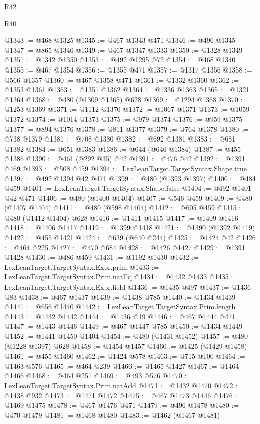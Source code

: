 \begin{lexlean}{R42}
\begin{lexlean}{R40}
\begin{coremodule}
{{{{{{{{{{{{{{{{{{{{{{{{{{{{{{{{{{{{{{{{{{{{{{{{{{{{{{{{{{{{{{{{{{{{{{{{{{{{{{{{{{{{{{{{{{{{{{{{{{{{{{{{{{{{{@1343 := @468 @1325
@1345 := @467 @1343 @471
@1346 := @496 @1345
@1347 := @865 @1346
@1349 := @467 @1347 @1333
@1350 := @1328 @1349
@1351 := @1342 @1350
@1353 := @492 @1295 @72
@1354 := @468 @1340
@1355 := @467 @1354
@1356 := @1355 @471
@1357 := @1317 @1356
@1358 := @566 @1357
@1360 := @467 @1358 @471
@1361 := @1332 @1360
@1362 := @1353 @1361
@1363 := @1351 @1362
@1364 := @1336 @1363
@1365 := @1321 @1364
@1368 := @480 (@1309 @1365) @628
@1369 := @1294 @1368
@1370 := @1253 @1369
@1371 := @1112 @1370
@1372 := @1067 @1371
@1373 := @1059 @1372
@1374 := @1014 @1373
@1375 := @979 @1374
@1376 := @959 @1375
@1377 := @894 @1376
@1378 := @811 @1377
@1379 := @764 @1378
@1380 := @738 @1379
@1381 := @708 @1380
@1382 := @692 @1381
@1383 := @681 @1382
@1384 := @651 @1383
@1386 := @644 (@646 @1384)
@1387 := @455 @1386
@1390 := @461 (@292 @35) @42
@1391 := @476 @42
@1392 := @1391 @469
@1393 := @508 @459
@1394 := LexLeanTarget.TargetSyntax.Shape.true
@1397 := @492 @1394 @42 @471
@1399 := @480 (@1393 @1397)
@1400 := @484 @459
@1401 := LexLeanTarget.TargetSyntax.Shape.false
@1404 := @492 @1401 @42 @471
@1406 := @480 (@1400 @1404)
@1407 := @546 @459
@1409 := @480 (@1407 @1404)
@1411 := @480 (@598 @1404)
@1412 := @605 @459
@1415 := @480 (@1412 @1404) @628
@1416 := @1411 @1415
@1417 := @1409 @1416
@1418 := @1406 @1417
@1419 := @1399 @1418
@1421 := @1390 (@1392 @1419)
@1422 := @455 @1421
@1424 := @639 (@640 @244)
@1425 := @1424 @42
@1426 := @464 @225
@1427 := @470 @684
@1428 := @1426 @1427
@1429 := @1391 @1428
@1430 := @486 @459
@1431 := @1192 @1430
@1432 := LexLeanTarget.TargetSyntax.Expr.prim
@1433 := LexLeanTarget.TargetSyntax.Prim.natEq
@1434 := @1432 @1433
@1435 := LexLeanTarget.TargetSyntax.Expr.field
@1436 := @1435 @497
@1437 := @1436 @83
@1438 := @467 @1437
@1439 := @1438 @785
@1440 := @1434 @1439
@1441 := @656 @1440
@1442 := LexLeanTarget.TargetSyntax.Prim.length
@1443 := @1432 @1442
@1444 := @1436 @19
@1446 := @467 @1444 @471
@1447 := @1443 @1446
@1449 := @467 @1447 @785
@1450 := @1434 @1449
@1452 := @1441 @1450 @1404
@1454 := @480 (@1431 @1452)
@1457 := @480 (@1228 @1397) @628
@1458 := @1454 @1457
@1460 := @1425 (@1429 @1458)
@1461 := @455 @1460
@1462 := @1424 @578
@1463 := @715 @100
@1464 := @1463 @576
@1465 := @464 @239
@1466 := @1465 @1427
@1467 := @1464 @1466
@1468 := @464 @251
@1469 := @493 @576
@1470 := LexLeanTarget.TargetSyntax.Prim.natAdd
@1471 := @1432 @1470
@1472 := @1438 @932
@1473 := @1471 @1472
@1475 := @467 @1473 @1446
@1476 := @1469 @1475
@1478 := @467 @1476 @471
@1479 := @496 @1478
@1480 := @470 @1479
@1481 := @1468 @1480
@1483 := @1462 (@1467 @1481)
}}}}}}}}}}}}}}}}}}}}}}}}}}}}}}}}}}}}}}}}}}}}}}}}}}}}}}}}}}}}}}}}}}}}}}}}}}}}}}}}}}}}}}}}}}}}}}}}}}}}}}}}}}}}}
\end{coremodule}
\end{lexlean}
\end{lexlean}
